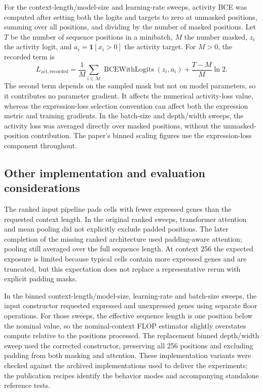 \documentclass[11pt]{article}
\begin{document}
For the context-length/model-size and learning-rate sweeps, activity BCE was computed after setting both the logits and targets to zero at unmasked positions, summing over all positions, and dividing by the number of masked positions.
Let $T$ be the number of sequence positions in a minibatch, $M$ the number masked, $z_i$ the activity logit, and $a_i=\mathbf{1}[x_i>0]$ the activity target. For $M>0$, the recorded term is
\begin{equation}
 L_{\mathrm{act,recorded}}
 = \frac{1}{M}\sum_{i\in\mathcal{M}}\operatorname{BCEWithLogits}(z_i,a_i)
   + \frac{T-M}{M}\ln 2.
\end{equation}
The second term depends on the sampled mask but not on model parameters, so it contributes no parameter gradient.
It affects the numerical activity-loss value, whereas the expression-loss selection convention can affect both the expression metric and training gradients.
In the batch-size and depth/width sweeps, the activity loss was averaged directly over masked positions, without the unmasked-position contribution.
The paper's binned scaling figures use the expression-loss component throughout.

\subsection{Other implementation and evaluation considerations}

The ranked input pipeline pads cells with fewer expressed genes than the requested context length.
In the original ranked sweeps, transformer attention and mean pooling did not explicitly exclude padded positions.
The later completion of the missing ranked architecture used padding-aware attention; pooling still averaged over the full sequence length.
At context 256 the expected exposure is limited because typical cells contain more expressed genes and are truncated, but this expectation does not replace a representative rerun with explicit padding masks.

In the binned context-length/model-size, learning-rate and batch-size sweeps, the input constructor requested expressed and unexpressed genes using separate floor operations.
For those sweeps, the effective sequence length is one position below the nominal value, so the nominal-context FLOP estimator slightly overstates compute relative to the positions processed.
The replacement binned depth/width sweep used the corrected constructor, preserving all 256 positions and excluding padding from both masking and attention.
These implementation variants were checked against the archived implementations used to deliver the experiments; the publication recipes identify the behavior modes and accompanying standalone reference tests.
\end{document}
